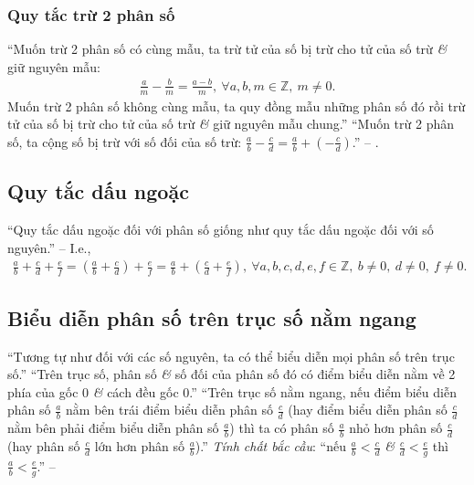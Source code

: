 \documentclass[oneside]{book}
\numberwithin{equation}{section}
\begin{document}
\subsubsection{Quy tắc trừ 2 phân số}
``Muốn trừ 2 phân số có cùng mẫu, ta trừ tử của số bị trừ cho tử của số trừ \textit{\&} giữ nguyên mẫu:
\begin{align*}
	\frac{a}{m} - \frac{b}{m} = \frac{a - b}{m},\ \forall a,b,m\in\mathbb{Z},\ m\ne 0.
\end{align*}
Muốn trừ 2 phân số không cùng mẫu, ta quy đồng mẫu những phân số đó rồi trừ tử của số bị trừ cho tử của số trừ \textit{\&} giữ nguyên mẫu chung.'' ``Muốn trừ 2 phân số, ta cộng số bị trừ với số đối của số trừ: $\frac{a}{b} - \frac{c}{d} = \frac{a}{b} + \left(-\frac{c}{d}\right)$.'' -- \cite[pp. 36--37]{Thai_Anh_Dat_Ha_Loan_Nam_Quang_Toan_6_tap_2}.

\subsection{Quy tắc dấu ngoặc}
``Quy tắc dấu ngoặc đối với phân số giống như quy tắc dấu ngoặc đối với số nguyên.'' -- \cite[p. 37]{Thai_Anh_Dat_Ha_Loan_Nam_Quang_Toan_6_tap_2} I.e.,
\begin{align*}
	\frac{a}{b} + \frac{c}{d} + \frac{e}{f} = \left(\frac{a}{b} + \frac{c}{d}\right) + \frac{e}{f} = \frac{a}{b} + \left(\frac{c}{d} + \frac{e}{f}\right),\ \forall a,b,c,d,e,f\in\mathbb{Z},\ b\ne 0,\ d\ne 0,\ f\ne 0.
\end{align*}

\subsection{Biểu diễn phân số trên trục số nằm ngang}
``Tương tự như đối với các số nguyên, ta có thể biểu diễn mọi phân số trên trục số.'' ``Trên trục số, phân số \textit{\&} số đối của phân số đó có điểm biểu diễn nằm về 2 phía của gốc 0 \textit{\&} cách đều gốc 0.'' ``Trên trục số nằm ngang, nếu điểm biểu diễn phân số $\frac{a}{b}$ nằm bên trái điểm biểu diễn phân số $\frac{c}{d}$ (hay điểm biểu diễn phân số $\frac{c}{d}$ nằm bên phải điểm biểu diễn phân số $\frac{a}{b}$) thì ta có phân số $\frac{a}{b}$ nhỏ hơn phân số $\frac{c}{d}$ (hay phân số $\frac{c}{d}$ lớn hơn phân số $\frac{a}{b}$).'' \textit{Tính chất bắc cầu}: ``nếu $\frac{a}{b} < \frac{c}{d}$ \textit{\&} $\frac{c}{d} < \frac{e}{g}$ thì $\frac{a}{b} < \frac{e}{g}$.'' -- \cite[p. 39]{Thai_Anh_Dat_Ha_Loan_Nam_Quang_Toan_6_tap_2}

\end{document}
